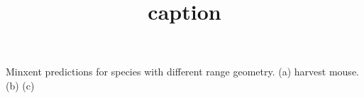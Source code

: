 \title{caption}
Minxent predictions for species with different range geometry. (a) harvest mouse. (b) (c)
  